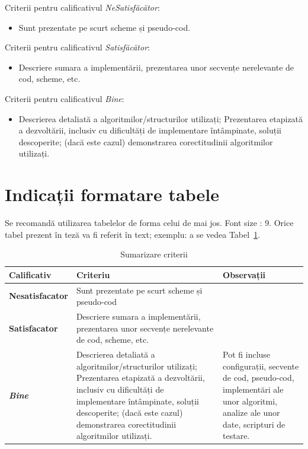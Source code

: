 \documentclass[12pt,a4paper]{report}
\begin{document}
Criterii pentru calificativul \textit{Ne\textit{Satisfăcător}}:
\begin{itemize}
	\item	Sunt prezentate pe scurt scheme și pseudo-cod.
\end{itemize}
Criterii pentru calificativul \textit{Satisfăcător}:
\begin{itemize}
	\item	Descriere sumara a implementării, prezentarea unor secvențe nerelevante de cod, scheme, etc.
\end{itemize}
Criterii pentru calificativul \textit{Bine}:
\begin{itemize}
	\item	Descrierea detaliată a algoritmilor/structurilor utilizați; Prezentarea etapizată a dezvoltării, inclusiv cu dificultăți de implementare întâmpinate, soluții descoperite; (dacă este cazul) demonstrarea corectitudinii algoritmilor utilizați.
\end{itemize}

\section{Indicații formatare tabele}
Se recomandă utilizarea tabelelor de forma celui de mai jos.  Font size :  9.
Orice tabel prezent în teză va fi referit în text; exemplu: a se vedea Tabel~\ref{tab:criterii}.

\begin{table}[th]\small\linespread{1}
\caption{Sumarizare criterii}
\label{tab:criterii}
\begin{tabular}{l >{\raggedright\arraybackslash}p{8cm} >{\raggedright\arraybackslash}p{4cm}}
\textbf{Calificativ} & \textbf{Criteriu} & \textbf{Observații} \\\hline
\textbf{Nesatisfacator} & Sunt prezentate pe scurt scheme și pseudo-cod & \\\hline
\textbf{Satisfacator} &Descriere sumara a implementării, prezentarea unor secvențe nerelevante de cod, scheme, etc.& \\
\hline
\textbf{\textit{Bine}} &Descrierea detaliată a algoritmilor/structurilor utilizați; Prezentarea etapizată a dezvoltării, inclusiv cu dificultăți de implementare întâmpinate, soluții descoperite; (dacă este cazul) demonstrarea corectitudinii algoritmilor utilizați. & Pot fi incluse configurații, secvente de cod, pseudo-cod, implementări ale unor algoritmi, analize ale unor date, scripturi de testare. \\
\hline
\end{tabular}
\end{table}
\end{document}
